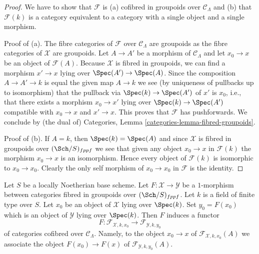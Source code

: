 \begin{proof}
We have to show that $\mathcal{F}$ is (a) cofibred in groupoids over
$\mathcal{C}_\Lambda$ and (b) that $\mathcal{F}(k)$ is a category equivalent
to a category with a single object and a single morphism.

\medskip\noindent
Proof of (a). The fibre categories of $\mathcal{F}$
over $\mathcal{C}_\Lambda$ are groupoids as the fibre categories
of $\mathcal{X}$ are groupoids. Let $A \to A'$ be a morphism of
$\mathcal{C}_\Lambda$ and let $x_0 \to x$ be an object of $\mathcal{F}(A)$.
Because $\mathcal{X}$ is fibred in groupoids, we can find a morphism
$x' \to x$ lying over $\Spec(A') \to \Spec(A)$. Since the composition
$A \to A' \to k$ is equal the given map $A \to k$ we see (by uniqueness
of pullbacks up to isomorphism) that the pullback via $\Spec(k) \to \Spec(A')$
of $x'$ is $x_0$, i.e., that there exists a morphism $x_0 \to x'$
lying over $\Spec(k) \to \Spec(A')$ compatible with
$x_0 \to x$ and $x' \to x$. This proves that $\mathcal{F}$ has
pushforwards. We conclude by (the dual of)
Categories, Lemma \ref{categories-lemma-fibred-groupoids}.

\medskip\noindent
Proof of (b). If $A = k$, then $\Spec(k) = \Spec(A)$ and since $\mathcal{X}$
is fibred in groupoids over $(\Sch/S)_{fppf}$ we see that given any object
$x_0 \to x$ in $\mathcal{F}(k)$ the morphism $x_0 \to x$ is an isomorphism.
Hence every object of $\mathcal{F}(k)$ is isomorphic to $x_0 \to x_0$.
Clearly the only self morphism of $x_0 \to x_0$ in $\mathcal{F}$ is
the identity.
\end{proof}

Let $S$ be a locally Noetherian base scheme. Let
$F : \mathcal{X} \to \mathcal{Y}$ be a $1$-morphism between categories
fibred in groupoids over $(\Sch/S)_{fppf}$. Let $k$ is a field
of finite type over $S$. Let $x_0$ be an object of $\mathcal{X}$ lying
over $\Spec(k)$. Set $y_0 = F(x_0)$ which is an object of $\mathcal{Y}$
lying over $\Spec(k)$. Then $F$ induces a functor
\begin{equation}
\label{equation-functoriality}
F :
\mathcal{F}_{\mathcal{X}, k, x_0}
\longrightarrow
\mathcal{F}_{\mathcal{Y}, k, y_0}
\end{equation}
of categories cofibred over $\mathcal{C}_\Lambda$. Namely, to the object
$x_0 \to x$ of $\mathcal{F}_{\mathcal{X}, k, x_0}(A)$ we associate
the object $F(x_0) \to F(x)$ of $\mathcal{F}_{\mathcal{Y}, k, y_0}(A)$.

